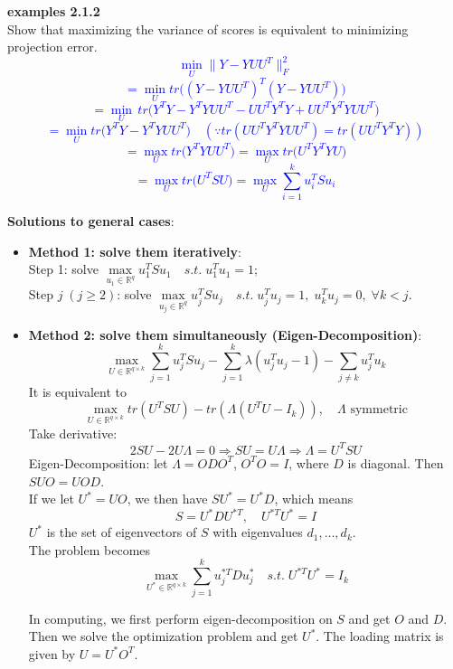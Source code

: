 \documentclass[12pt]{book}
\theoremstyle{definition}
\theoremstyle{remark}
\newcommand{\R}{\mathbb{R}}
\begin{document}
\begin{enumerate}
    \textbf{examples 2.1.2}\\
    Show that maximizing the variance of scores is equivalent to
minimizing projection error.\\

\textcolor{blue}{
\[\underset{U}{\min} \| Y - YUU^T \|_F^2\]\[ = \underset{U}{\min}  tr \big( (Y - YUU^T)^T (Y - YUU^T) \big)\]
\[= \underset{U}{\min} \, tr \big( Y^T Y - Y^T YUU^T - UU^T Y^T Y + UU^T Y^T YUU^T \big)\]
\[= \underset{U}{\min} tr \big( Y^T Y - Y^T YUU^T \big)\quad (\because tr(UU^T Y^T YUU^T) = tr(UU^T Y^T Y))\]
\[= \underset{U}{\max} tr \big( Y^T YUU^T \big) = \underset{U}{\max} tr \big(U^T Y^T YU \big) \]\[= \underset{U}{\max} tr\big( U^T S U \big) = \underset{U}{\max} \sum_{i=1}^k u_i^T S u_i\]
}

\textbf{Solutions to general cases}:\\
\begin{itemize}
    \item \textbf{Method 1: solve them iteratively}:\\
    
    Step 1: solve $\underset{u_1\in\R^q}{\max} u_1^TSu_1 \quad s.t.\;u_1^Tu_1 = 1$;\\
    Step $j\; (j\ge 2)$: solve $\underset{u_j\in\R^q}{\max} u_j^TSu_j \quad s.t.\;u_j^Tu_j = 1, \;u_k^Tu_j = 0, \; \forall k<j$.

    \item \textbf{Method 2: solve them simultaneously (Eigen-Decomposition)}:\\

    \[\underset{U\in\R^{q\times k}}{\max} \sum_{j=1}^k u_j^TSu_j - \sum_{j=1}^k\lambda (u_j^Tu_j - 1) - \sum_{j\ne k}u_j^Tu_k\]
    It is equivalent to 
    \[\underset{U\in\R^{q\times k}}{\max} tr(U^TSU) - tr(\Lambda(U^TU-I_k)), \quad \Lambda \text{ symmetric}\]
    Take derivative:
    \[2SU-2U\Lambda = 0 \Rightarrow SU = U\Lambda \Rightarrow \Lambda = U^TSU\]
    Eigen-Decomposition: let $\Lambda = ODO^T$, $O^TO = I$, where $D$ is diagonal. Then $SUO = UOD$.\\
    If we let $U^* = UO$, we then have $SU^* = U^*D$, which means
    \[S = U^*DU^{*T},\quad U^{*T}U^* = I\]
    $U^*$ is the set of eigenvectors of $S$ with eigenvalues $d_1,\dots,d_k$.\\
    The problem becomes 
    \[\underset{U^*\in\R^{q\times k}}{\max} \sum_{j=1}^k u_j^{*T}Du_j^* \quad s.t.\;U^{*T}U^* = I_k\]

    In computing, we first perform eigen-decomposition on $S$ and get $O$ and $D$. Then we solve the optimization problem and get $U^*$. The loading matrix is given by $U = U^*O^T$.


\end{itemize}
\end{enumerate}
\end{document}

